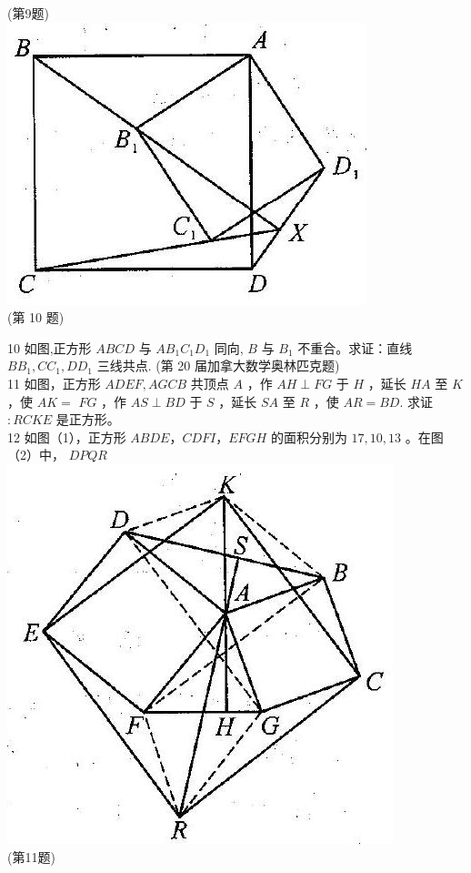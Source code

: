 \documentclass[10pt]{article}
\begin{document}
(第9题)\\
\includegraphics[max width=\textwidth, center]{2024_10_30_2c8f45efd4a519b08e1ag-136(2)}\\
(第 10 题)

10 如图,正方形 $A B C D$ 与 $A B_{1} C_{1} D_{1}$ 同向, $B$ 与 $B_{1}$ 不重合。求证：直线 $B B_{1}, C C_{1}, D D_{1}$ 三线共点. (第 20 届加拿大数学奥林匹克题)\\
11 如图，正方形 $A D E F, A G C B$ 共顶点 $A$ ，作 $A H \perp F G$ 于 $H$ ，延长 $H A$ 至 $K$ ，使 $A K=$ $F G$ ，作 $A S \perp B D$ 于 $S$ ，延长 $S A$ 至 $R$ ，使 $A R=B D$. 求证 $: R C K E$ 是正方形。\\
12 如图（1），正方形 $A B D E ， C D F I ， E F G H$ 的面积分别为 $17,10,13$ 。在图（2）中， $D P Q R$\\
\includegraphics[max width=\textwidth, center]{2024_10_30_2c8f45efd4a519b08e1ag-136(5)}\\
(第11题)
\end{document}
